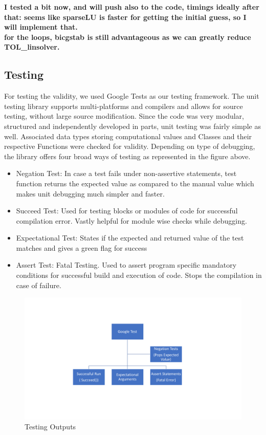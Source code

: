 \documentclass[11pt]{scrartcl}
\begin{document}
	\textbf{I tested a bit now, and will push also to the code, timings ideally after that:
	seems like sparseLU is faster for getting the initial guess, so I will implement that.\\
	for the loops, bicgstab is still advantageous as we can greatly reduce TOL\_linsolver.}
\normalfont
\subsection{Testing}
For testing the validity, we used Google Tests as our testing framework. The unit testing library supports multi-platforms and compilers and allows for source testing, without large source modification. Since the code was very modular, structured and independently developed in parts, unit testing was fairly simple as well. Associated data types storing computational values and Classes and their respective Functions were checked for validity. 
Depending on type of debugging, the library offers four broad ways of testing as represented in the figure above.

\begin{itemize}
  \item Negation Test: In case a test fails under non-assertive statements, test function returns the expected value as compared to the manual value which makes unit debugging much simpler and faster.
  \item Succeed Test: Used for testing blocks or modules of code for successful compilation error. Vastly helpful for module wise checks while debugging.
 \item Expectational Test: States if the expected and returned value of the test matches and gives a green flag for success
 \item Assert Test: Fatal Testing. Used to assert program specific mandatory conditions for successful build and execution of code. Stops the compilation in case of failure.
\end{itemize}

\begin{figure}
	\centering
	\includegraphics[width=1\textwidth]{figs/Test.pdf}
	\caption{Testing Outputs}\label{fig:Google Test}
\end{figure}
\end{document}
